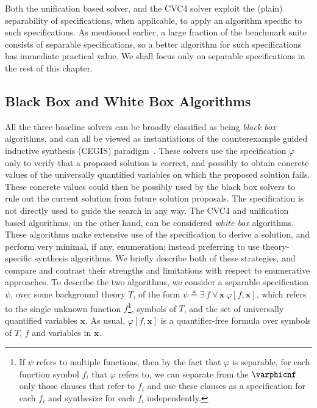 Both the unification based solver, and the CVC4 \sygusbody solver exploit
the (plain) separability of specifications, when applicable, to apply an
algorithm specific to such specifications. As mentioned earlier, a
large fraction of the \sygusbody benchmark suite consists of separable
specifications, so a better algorithm for such specifications has
immediate practical value. We shall focus only on separable
specifications in the rest of this chapter.

\subsection{Black Box and White Box Algorithms}
\label{subsection:black_and_white}
All the three baseline \sygusbody solvers can be broadly classified as
being \emph{black box} algorithms, and can all be viewed as
instantiations of the counterexample guided inductive synthesis
(CEGIS) paradigm~\cite{solar-lezama-05}. These solvers use the
specification $\varphi$ only to verify that a proposed solution is
correct, and possibly to obtain concrete values of the universally
quantified variables on which the proposed solution fails.  These
concrete values could then be possibly used by the black box solvers
to rule out the current solution from future solution proposals.  The
specification is not directly used to guide the search in any way. The
CVC4 and unification based algorithms, on the other hand, can be
considered \emph{white box} algorithms. These algorithms make
extensive use of the specification to derive a solution, and perform
very minimal, if any, enumeration; instead preferring to use
theory-specific synthesis algorithms. We briefly describe both of
these strategies, and compare and contrast their strengths and
limitations with respect to enumerative approaches.  To describe the
two algorithms, we consider a separable \sygusbody specification $\psi$,
over some background theory $T$, of the form $\psi \triangleq
\exists\,f\ \forall\,\mathbf{x}\ \varphi[f, \mathbf{x}]$, which refers
to the single unknown function $f$\footnote{If $\psi$ refers to
multiple functions, then by the fact that $\varphi$ is separable, for
each function symbol $f_i$ that $\varphi$ refers to, we can separate
from the $\varphicnf$ only those clauses that refer to $f_i$ and use
these clauses as a specification for each $f_i$ and synthesize for
each $f_i$ independently.}, symbols of $T$, and the set of universally
quantified variables $\mathbf{x}$. As usual, $\varphi[f, \mathbf{x}]$
is a quantifier-free formula over symbols of $T$, $f$ and variables in
$\mathbf{x}$.

